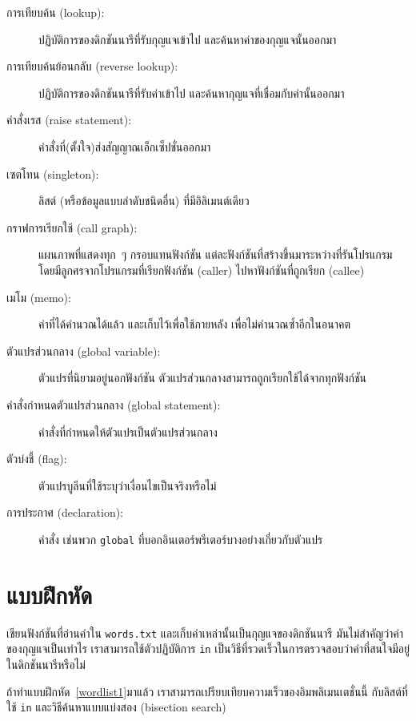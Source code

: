 \begin{description}
\item[การเทียบค้น (lookup):] ปฏิบัติการของดิกชันนารีที่รับกุญแจเข้าไป และค้นหาค่าของกุญแจนั้นออกมา

\item[การเทียบค้นย้อนกลับ (reverse lookup):] ปฏิบัติการของดิกชันนารีที่รับค่าเข้าไป 
และค้นหากุญแจที่เชื่อมกับค่านั้นออกมา

\item[คำสั่งเรส (raise statement):]  
คำสั่งที่(ตั้งใจ)ส่งสัญญาณเอ็กเซ็ปชั่นออกมา

\item[เซตโทน (singleton):] ลิสต์ (หรือข้อมูลแบบลำดับชนิดอื่น) ที่มีอิลิเมนต์เดียว

\item[กราฟการเรียกใช้ (call graph):] แผนภาพที่แสดงทุก~ๆ กรอบแทนฟังก์ชัน แต่ละฟังก์ชันที่สร้างขึ้นมาระหว่างที่รันโปรแกรม โดยมีลูกศรจากโปรแกรมที่เรียกฟังก์ชัน (caller) ไปหาฟังก์ชันที่ถูกเรียก (callee) 

\item[เมโม (memo):] ค่าที่ได้คำนวณได้แล้ว และเก็บไว้เพื่อใช้ภายหลัง เพื่อไม่คำนวณซ้ำอีกในอนาคต

\item[ตัวแปรส่วนกลาง (global variable):] ตัวแปรที่นิยามอยู่นอกฟังก์ชัน
ตัวแปรส่วนกลางสามารถถูกเรียกใช้ได้จากทุกฟังก์ชัน

\item[คำสั่งกำหนดตัวแปรส่วนกลาง (global statement):]  คำสั่งที่กำหนดให้ตัวแปรเป็นตัวแปรส่วนกลาง

\item[ตัวบ่งชี้ (flag):] ตัวแปรบูลีนที่ใช้ระบุว่าเงื่อนไขเป็นจริงหรือไม่

\item[การประกาศ (declaration):] คำสั่ง เช่นพวก \texttt{global} ที่บอกอินเตอร์พรีเตอร์บางอย่างเกี่ยวกับตัวแปร

\end{description}


\section{แบบฝึกหัด}

\begin{exercise}
\label{wordlist2}

เขียนฟังก์ชันที่อ่านคำใน \texttt{words.txt} และเก็บคำเหล่านั้นเป็นกุญแจของดิกชันนารี  
มันไม่สำคัญว่าค่าของกุญแจเป็นเท่าไร
เราสามารถใช้ตัวปฏิบัติการ \texttt{in} เป็นวิธีที่รวดเร็วในการตรวจสอบว่าคำที่สนใจมีอยู่ในดิกชันนารีหรือไม่

ถ้าทำแบบฝึกหัด~\ref{wordlist1}มาแล้ว เราสามารถเปรียบเทียบความเร็วของอิมพลิเมนเตชั่นนี้ กับลิสต์ที่ใช้ \texttt{in} และวิธีค้นหาแบบแบ่งสอง (bisection search)

\end{exercise}
\vspace{0.5cm}



